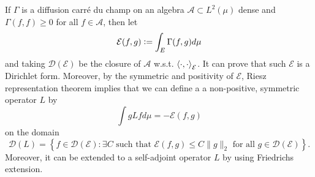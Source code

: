 If $\Gamma$ is a diffusion carr\'e du champ on an algebra $\mathcal{A} \subset L^2(\mu)$ dense and $\Gamma(f,f) \geq 0$ for all $f \in \mathcal{A}$, then let
\begin{equation*}
	\mathcal{E}(f,g) \vcentcolon= \int_E \Gamma(f,g)d\mu
\end{equation*}
and taking $\mathcal{D}(\mathcal{E})$ be the closure of $\mathcal{A}$ w.s.t. $\left\langle \cdot,\cdot \right\rangle_{\mathcal{E}}$. It can prove that such $\mathcal{E}$ is a Dirichlet form. Moreover, by the symmetric and positivity of $\mathcal{E}$, Riesz representation theorem implies that we can define a a non-positive, symmetric operator $L$ by
\begin{equation*}
	\int g L f d \mu=-\mathcal{E}(f, g)
\end{equation*}
on the domain
\begin{equation*}
	\mathcal{D}(L)=\left\{f \in \mathcal{D}(\mathcal{E}): \exists C \text { such that } \mathcal{E}(f, g) \leq C\|g\|_2 \text { for all } g \in \mathcal{D}(\mathcal{E})\right\}.
\end{equation*}
Moreover, it can be extended to a self-adjoint operator $L$ by using Friedrichs extension.

